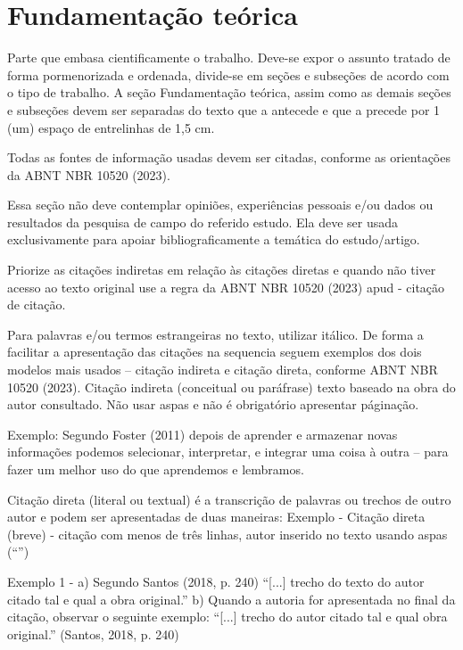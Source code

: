 \documentclass[
article,			%
11pt,				%
twoside,			%
a4paper,			%
section=TITLE,		%
onecolumn,          %
english,			%
brazil,				%
sumario=tradicional
]{abntex2}
\begin{document}
\section{Fundamentação teórica}

Parte que embasa cientificamente o trabalho. Deve-se expor o assunto tratado de forma pormenorizada e ordenada, divide-se em seções e subseções de acordo com o tipo de trabalho. A seção Fundamentação teórica, assim como as demais seções e subseções devem ser separadas do texto que a antecede e que a precede por 1 (um) espaço de entrelinhas de 1,5 cm.

Todas as fontes de informação usadas devem ser citadas, conforme as orientações da ABNT NBR 10520 (2023). 

Essa seção não deve contemplar opiniões, experiências pessoais e/ou dados ou resultados da pesquisa de campo do referido estudo. Ela deve ser usada exclusivamente para apoiar bibliograficamente a temática do estudo/artigo.

Priorize as citações indiretas em relação às citações diretas e quando não tiver acesso ao texto original use a regra da ABNT NBR 10520 (2023) apud - citação de citação.

Para palavras e/ou termos estrangeiras no texto, utilizar itálico. 
De forma a facilitar a apresentação das citações na sequencia seguem exemplos dos dois modelos mais usados – citação indireta e citação direta, conforme ABNT NBR 10520 (2023).
Citação indireta  (conceitual ou paráfrase) texto baseado na obra do autor consultado. Não usar aspas e não é obrigatório apresentar páginação.

Exemplo:  Segundo Foster (2011) depois de aprender e armazenar novas informações podemos selecionar, interpretar, e integrar uma coisa à outra – para fazer um melhor uso do que aprendemos e lembramos.

Citação direta (literal ou textual) é a transcrição de palavras ou trechos de outro autor e podem ser apresentadas de duas maneiras:
Exemplo - Citação direta (breve) - citação com menos de três linhas, autor inserido no texto usando aspas (“”)

Exemplo 1 - a) Segundo Santos (2018, p. 240) “[...] trecho do texto do autor citado tal e qual a obra original.” b) Quando a autoria for apresentada no final da citação, observar o seguinte exemplo: “[...] trecho do autor citado tal e qual obra original.” (Santos, 2018, p. 240)
\end{document}
